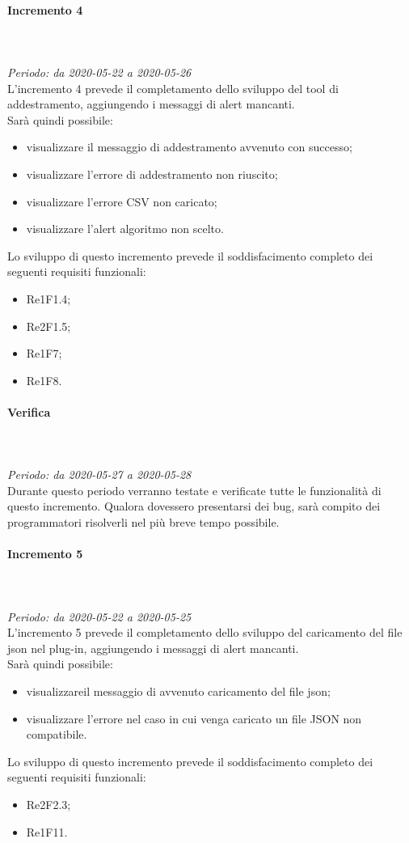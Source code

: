 \paragraph{Incremento 4}\mbox{} \\ \mbox{} \\ 
\textit{Periodo: da 2020-05-22 a 2020-05-26}\\
L’incremento 4 prevede il completamento dello sviluppo del tool di addestramento, aggiungendo i messaggi di alert mancanti.\\
Sarà quindi possibile:
\begin{itemize}
	\item visualizzare il messaggio di addestramento avvenuto con successo;
	\item visualizzare l'errore di addestramento non riuscito;
	\item visualizzare l'errore CSV non caricato;
	\item visualizzare l'alert algoritmo non scelto. 
\end{itemize}
Lo sviluppo di questo incremento prevede il soddisfacimento completo dei seguenti requisiti funzionali:
\begin{itemize}
\item Re1F1.4;
\item Re2F1.5;
\item Re1F7;
\item Re1F8.
\end{itemize}
\paragraph*{Verifica}\mbox{} \\ \mbox{} \\ 
\textit{Periodo: da 2020-05-27 a 2020-05-28}\\
Durante questo periodo verranno testate e verificate tutte le funzionalità di questo incremento. Qualora dovessero presentarsi dei bug, sarà compito dei programmatori risolverli nel più breve tempo possibile.

\paragraph{Incremento 5}\mbox{} \\ \mbox{} \\ 
\textit{Periodo: da 2020-05-22 a 2020-05-25}\\
L’incremento 5 prevede il completamento dello sviluppo del caricamento del file json nel plug-in, aggiungendo i messaggi di alert mancanti.\\
Sarà quindi possibile:
\begin{itemize}
	\item visualizzareil messaggio di avvenuto caricamento del file json;
	\item visualizzare l'errore nel caso in cui venga caricato un file JSON non compatibile.
\end{itemize}
Lo sviluppo di questo incremento prevede il soddisfacimento completo dei seguenti requisiti funzionali:
\begin{itemize}
\item Re2F2.3;
\item Re1F11.
\end{itemize}

